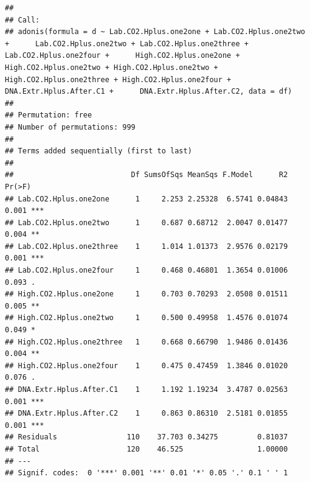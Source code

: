 \documentclass[]{article}
\begin{document}
\begin{verbatim}
## 
## Call:
## adonis(formula = d ~ Lab.CO2.Hplus.one2one + Lab.CO2.Hplus.one2two +      Lab.CO2.Hplus.one2two + Lab.CO2.Hplus.one2three + Lab.CO2.Hplus.one2four +      High.CO2.Hplus.one2one + High.CO2.Hplus.one2two + High.CO2.Hplus.one2two +      High.CO2.Hplus.one2three + High.CO2.Hplus.one2four + DNA.Extr.Hplus.After.C1 +      DNA.Extr.Hplus.After.C2, data = df) 
## 
## Permutation: free
## Number of permutations: 999
## 
## Terms added sequentially (first to last)
## 
##                           Df SumsOfSqs MeanSqs F.Model      R2 Pr(>F)    
## Lab.CO2.Hplus.one2one      1     2.253 2.25328  6.5741 0.04843  0.001 ***
## Lab.CO2.Hplus.one2two      1     0.687 0.68712  2.0047 0.01477  0.004 ** 
## Lab.CO2.Hplus.one2three    1     1.014 1.01373  2.9576 0.02179  0.001 ***
## Lab.CO2.Hplus.one2four     1     0.468 0.46801  1.3654 0.01006  0.093 .  
## High.CO2.Hplus.one2one     1     0.703 0.70293  2.0508 0.01511  0.005 ** 
## High.CO2.Hplus.one2two     1     0.500 0.49958  1.4576 0.01074  0.049 *  
## High.CO2.Hplus.one2three   1     0.668 0.66790  1.9486 0.01436  0.004 ** 
## High.CO2.Hplus.one2four    1     0.475 0.47459  1.3846 0.01020  0.076 .  
## DNA.Extr.Hplus.After.C1    1     1.192 1.19234  3.4787 0.02563  0.001 ***
## DNA.Extr.Hplus.After.C2    1     0.863 0.86310  2.5181 0.01855  0.001 ***
## Residuals                110    37.703 0.34275         0.81037           
## Total                    120    46.525                 1.00000           
## ---
## Signif. codes:  0 '***' 0.001 '**' 0.01 '*' 0.05 '.' 0.1 ' ' 1
\end{verbatim}
\end{document}
